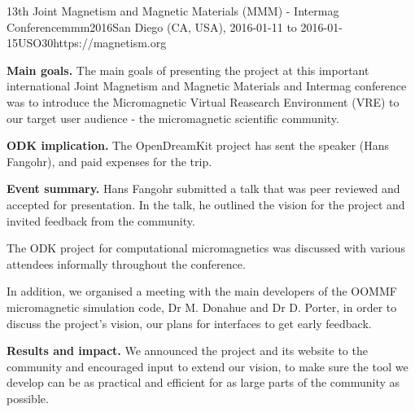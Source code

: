 \begin{event}{13th Joint Magnetism and Magnetic Materials (MMM) -
    Intermag Conference}{mmm2016}{San Diego (CA, USA), 2016-01-11 to
    2016-01-15}{USO}{30}{https://magnetism.org}

  \textbf{Main goals.} The main goals of presenting the project at
  this important international Joint Magnetism and Magnetic Materials
  and Intermag conference was to introduce the Micromagnetic Virtual
  Reasearch Environment (VRE) to our target user audience - the
  micromagnetic scientific community.


\textbf{ODK implication.} The OpenDreamKit project has sent the
speaker (Hans Fangohr), and paid expenses for the trip.

\textbf{Event summary.} Hans Fangohr submitted a talk \cite{16FangohrOOMMF} that was peer
reviewed and accepted for presentation. In the talk, he outlined the
vision for the project and invited feedback from the community.

The ODK project for computational micromagnetics was discussed with
various attendees informally throughout the conference.

In addition, we organised a meeting with the main developers of the
OOMMF micromagnetic simulation code, Dr M. Donahue and
Dr D. Porter, in order to discuss the project's vision, our plans for
interfaces to get early feedback.


\textbf{Results and impact.} We announced the project and its website
to the community and encouraged input to extend our vision, to make
sure the tool we develop can be as practical and efficient for as
large parts of the community as possible.

\end{event}
